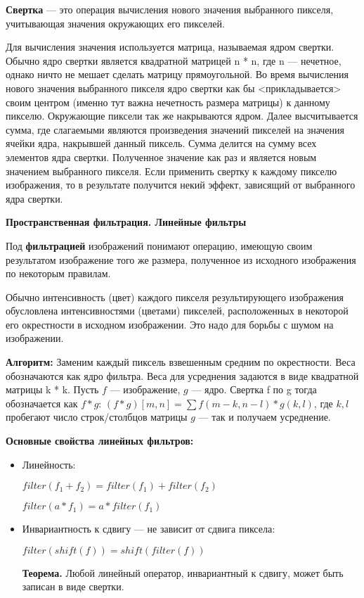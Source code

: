\textbf{Свертка} --- это операция вычисления нового значения выбранного пикселя, учитывающая значения окружающих его пикселей.

Для вычисления значения используется матрица, называемая ядром свертки. Обычно ядро свертки является квадратной матрицей n * n, где n --- нечетное, однако ничто не мешает сделать матрицу прямоугольной.
Во время вычисления нового значения выбранного пикселя ядро свертки как бы <прикладывается> своим центром (именно тут важна нечетность размера матрицы) к данному пикселю. Окружающие пиксели так же накрываются ядром.
Далее высчитывается сумма, где слагаемыми являются произведения значений пикселей на значения ячейки ядра, накрывшей данный пиксель. Сумма делится на сумму всех элементов ядра свертки. Полученное значение как раз и является новым значением выбранного пикселя.
Если применить свертку к каждому пикселю изображения, то в результате получится некий эффект, зависящий от выбранного ядра свертки.

\textbf{Пространственная фильтрация. Линейные фильтры}

Под \textbf{фильтрацией} изображений понимают операцию, имеющую своим результатом изображение того же размера, полученное из исходного изображения по некоторым правилам.

Обычно интенсивность (цвет) каждого пикселя результирующего изображения обусловлена интенсивностями (цветами) пикселей, расположенных в некоторой его окрестности в исходном изображении. Это надо для борьбы с шумом на изображении.

\textbf{Алгоритм:} Заменим каждый пиксель взвешенным средним по окрестности. Веса обозначаются как ядро фильтра. Веса для усреднения задаются в виде квадратной матрицы k * k. \newline
Пусть $f$ --- изображение, $g$ --- ядро. Свертка f по g тогда обозначается как $f*g$: $(f * g)[m,n] = \sum f(m-k,n-l)*g(k,l)$, где $k,l$ пробегают число строк/столбцов матрицы $g$ --- так и получаем усреднение.

\textbf{Основные свойства линейных фильтров:}
\begin{itemize}
    \item Линейность: 
    
    $filter(f_1 + f_2) = filter(f_1) + filter(f_2)$
    
    $filter(a * f_1) = a * filter(f_1)$
    
    \item Инвариантность к сдвигу --- не зависит от сдвига пиксела: 
    
    $filter(shift(f)) = shift(filter(f))$
    
    \textbf{Теорема.} Любой линейный оператор, инвариантный к сдвигу, может быть записан в виде свертки.
    
\end{itemize}

